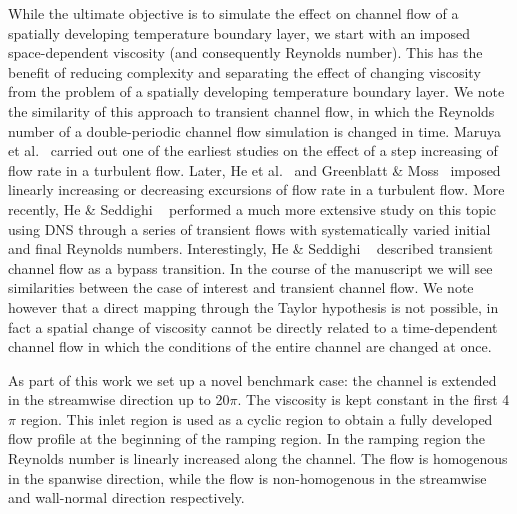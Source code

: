 \documentclass[twocolumn,10pt]{asme2e}
\begin{document}
While the ultimate objective is to simulate the effect on channel flow of a spatially developing temperature boundary layer, we start with an imposed  space-dependent viscosity (and consequently Reynolds number). This has the benefit of reducing complexity and separating the effect of changing viscosity from the problem of a spatially developing temperature boundary layer. We note the similarity of this approach to transient channel flow, in which the Reynolds number of a double-periodic channel flow simulation is changed in time.  Maruya et al.~\cite{maruyama1976} carried out one of the earliest studies on the effect of a step increasing of flow rate in a turbulent flow. Later, He et al.~\cite{he2000} and  Greenblatt \& Moss~\cite{greenblatt2004} imposed linearly increasing or decreasing excursions of flow rate in a turbulent flow. More recently, He \& Seddighi ~\cite{he2015} performed a much more extensive study on this topic using DNS through a series of transient flows with systematically varied initial and final Reynolds numbers. Interestingly, He \& Seddighi ~\cite{he2015}  described transient channel flow as a bypass transition. In the course of the manuscript we will see similarities between the case of interest and transient channel flow. We note however that a direct mapping through the Taylor hypothesis is not possible, in fact a spatial change of viscosity cannot be directly related to a time-dependent channel flow in which the conditions of the entire channel are changed at once.

As part of this work we set up a novel benchmark case: the channel is extended in the streamwise direction up to 20\(\pi\). The viscosity is kept constant in the first 4\(\pi\) region. This inlet region is used as a cyclic region to obtain a fully developed flow profile at the beginning of the ramping region. In the ramping region the Reynolds number is linearly increased along the channel. The flow is homogenous in the spanwise direction, while the flow is non-homogenous in the streamwise and wall-normal direction respectively. 
\end{document}
